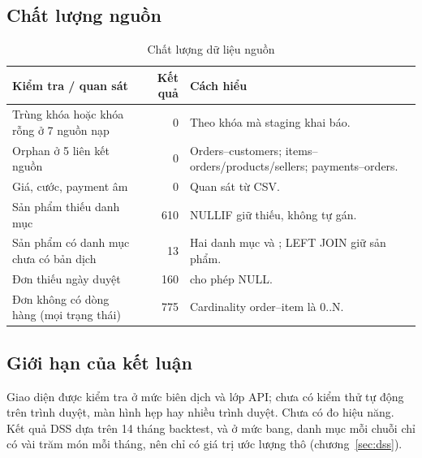 \subsection{Chất lượng nguồn}
\begin{table}[H]\centering\small
\begin{tabularx}{\linewidth}{YrY}
\toprule Kiểm tra / quan sát & Kết quả & Cách hiểu\\\midrule
Trùng khóa hoặc khóa rỗng ở 7 nguồn nạp & 0 & Theo khóa mà staging khai báo.\\
Orphan ở 5 liên kết nguồn & 0 & Orders--customers; items--orders/products/sellers; payments--orders.\\
Giá, cước, payment âm & 0 & Quan sát từ CSV.\\
Sản phẩm thiếu danh mục & 610 & NULLIF giữ thiếu, không tự gán.\\
Sản phẩm có danh mục chưa có bản dịch & 13 & Hai danh mục  và ; LEFT JOIN giữ sản phẩm.\\
Đơn thiếu ngày duyệt & 160 &  cho phép NULL.\\
Đơn không có dòng hàng (mọi trạng thái) & 775 & Cardinality order--item là 0..N.\\
\bottomrule\end{tabularx}
\caption{Chất lượng dữ liệu nguồn}
\end{table}

\subsection{Giới hạn của kết luận}
Giao diện được kiểm tra ở mức biên dịch và lớp API; chưa có kiểm thử tự động trên trình duyệt, màn hình hẹp hay nhiều trình duyệt. Chưa có đo hiệu năng. Kết quả DSS dựa trên 14 tháng backtest, và ở mức bang, danh mục mỗi chuỗi chỉ có vài trăm món mỗi tháng, nên chỉ có giá trị ước lượng thô (chương~\ref{sec:dss}).
